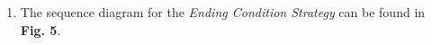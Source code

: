 \documentclass[a4paper,11pt]{article}
\begin{document}
\begin{enumerate}
\item The sequence diagram for the \textit{Ending Condition Strategy} can be found in \textbf{Fig. 5}. \\
\begin{minipage}{\linewidth}
\end{minipage}
\end{enumerate}

\end{document}
